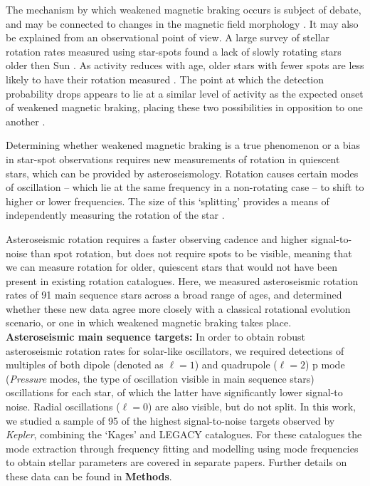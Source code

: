 \documentclass[12pt]{article}
\newcommand{\rtwo}[1]{{#1}}
\begin{document}
The mechanism by which weakened magnetic braking occurs is subject of debate, and may be connected to changes in the magnetic field morphology \cite{vansaders+2016,reville+2015,garraffo+2016, metcalfe+2016, metcalfe+2019, see+2019}. It may also be explained from an observational point of view. A large survey of stellar rotation rates measured using star-spots found a lack of slowly rotating stars older then Sun \cite{mcquillan+2014}. As activity reduces with age, older stars with fewer spots are less likely to have their rotation measured \cite{matt+2015, reinhold+2020}. The point at which the detection probability drops appears to lie at a similar level of activity as the expected onset of weakened magnetic braking, placing these two possibilities in opposition to one another \cite{vansaders+2019}.

Determining whether weakened magnetic braking is a true phenomenon or a bias in star-spot observations requires new measurements of rotation in quiescent stars, which can be provided by asteroseismology. \rtwo{Rotation causes certain modes of oscillation -- which lie at the same frequency in a non-rotating case -- to shift to higher or lower frequencies. The size of this `splitting' provides a means of independently measuring the rotation of the star \cite{ledoux1951}}. 

Asteroseismic rotation requires a faster observing cadence and higher signal-to-noise than spot rotation, but does not require spots to be visible, meaning that we can measure rotation for older, quiescent stars that would not have been present in existing rotation catalogues. 
Here, we measured asteroseismic rotation rates of 91 main sequence stars across a broad range of  ages, and determined whether \rtwo{these new data agree} more closely with a classical rotational evolution scenario, or one in which weakened magnetic braking takes place.\\

\textbf{Asteroseismic main sequence targets:} In order to obtain robust asteroseismic rotation rates for solar-like oscillators, we required detections of multiples of both dipole (denoted as $\ell = 1$) and quadrupole ($\ell = 2$) p mode (\textit{Pressure} modes, the type of oscillation visible in main sequence stars) oscillations for each star, of which the latter have significantly lower signal-to noise. Radial oscillations ($\ell = 0$) are also visible, but do not split. In this work, we studied a sample of 95 of the highest signal-to-noise targets observed by \textit{Kepler}, combining the `Kages' \cite{silvaaguirre+2015,davies+2016} and LEGACY \cite{lund+2017, silvaaguirre+2017} catalogues. For these catalogues the mode extraction through frequency fitting \cite{davies+2016, lund+2017} and modelling using mode frequencies to obtain stellar parameters \cite{silvaaguirre+2015, silvaaguirre+2017} are covered in separate papers. Further details on these data can be found in \textbf{Methods}. 
\end{document}
